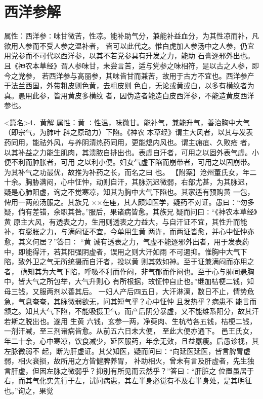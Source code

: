 \documentclass[a4paper,12pt,UTF8,twoside]{ctexbook}
\begin{document}
\chapter{西洋参解}
属性：西洋参∶味甘微苦，性凉。能补助气分，兼能补益血分，为其性凉而补，凡欲用人参而不受人参之温补者， 
皆可以此代之。惟白虎加人参汤中之人参，仍宜用党参而不可代以西洋参，以其不若党参具有升发之力，能助 
石膏逐邪外出也。且《神农本草经》谓人参味甘，未尝言苦，适与党参之味相符，是以古之人参，即今之党参， 
若西洋参与高丽参，其味皆甘而兼苦，故用于古方不宜也。西洋参产于法兰西国，外带粗皮则色黄，去粗皮则 
色白，无论或黄或白，以多有横纹者为真。愚用此参，皆用黄皮多横纹 
者，因伪造者能造白皮西洋参，不能造黄皮西洋参也。 


<篇名>4．黄解
属性：黄 ∶性温，味微甘。能补气，兼能升气，善治胸中大气（即宗气，为肺叶 辟之原动力）下陷。《神农 
本草经》谓主大风者，以其与发表药同用，能祛外风，与养阴清热药同用，更能熄内风也。谓主痈疽、久败疮 
者，以其补益之力能生肌肉，其溃脓自排出也。表虚自汗者，可用之以固外表气虚。小便不利而肿胀者，可用 
之以利小便。妇女气虚下陷而崩带者，可用之以固崩带。为其补气之功最优，故推为补药之长，而名之曰 也。 
【附案】沧州董氏女，年二十余。胸胁满闷，心中怔忡，动则自汗，其脉沉迟微弱，右部尤甚，为其脉迟， 
疑是心肺阳虚，询之不觉寒凉，知其为胸中大气下陷也。其家适有预购黄 一包，俾用一两煎汤服之。其族兄 
××在座，其人颇知医学，疑药不对证。愚曰∶“勿多疑，倘有差错，余职其咎。”服后，果诸病皆愈。其族兄 
疑而问曰∶“《神农本草经》黄 原主大风，有透表之力，生用则透表之力益大，与自汗证不宜，其性升而能 
补，有膨胀之力，与满闷证不宜，今单用生黄 两许，而两证皆愈，并心中怔忡亦愈，其义何居？”答曰∶ 
“黄 诚有透表之力，气虚不能逐邪外出者，用于发表药中，即能得汗，若其阳强阴虚者，误用之则大汗如雨 
不可遏抑。惟胸中大气下陷，致外卫之气无所统摄而自汗者，投以黄 则其效如神。至于证兼满闷而亦用之者， 
确知其为大气下陷，呼吸不利而作闷，非气郁而作闷也。至于心与肺同悬胸中，皆大气之所包举，大气升则心 
有所根据，故怔忡自止也。”继加桔梗二钱，知母三钱，又服两剂以善其后。 
一妇人产后四五日，大汗淋漓，数日不止，情势危急，气息奄奄，其脉微弱欲无，问其短气乎？心中怔忡 
且发热乎？病患不 
能言而颔之。知其大气下陷，不能吸摄卫气，而产后阴分暴虚，又不能维系阳分，故其汗若斯之脱出也。遂用 
生黄 六钱，玄参一两，净萸肉、生杭芍各五钱，桔梗二钱，一剂汗减，至三剂诸病皆愈。从前五六日未大便， 
至此大便亦通下。 
邑王氏女，年二十余，心中寒凉，饮食减少，延医服药，年余无效，且益羸瘦。后愚诊视，其左脉微弱不 
起，断为肝虚证。其父知医，疑而问曰∶“向延医延医，皆言脾胃虚弱，相火衰损，故所用之方皆健脾养胃， 
补助相火，曾未有言及肝虚者，先生独言肝虚，但因左脉之微弱乎？抑别有所见而云然乎？”答曰∶“肝脏之 
位置虽居于右，而其气化实先行于左，试问病患，其左半身必觉有不及右半身处，是其明征也。”询之，果觉 
\end{document}

